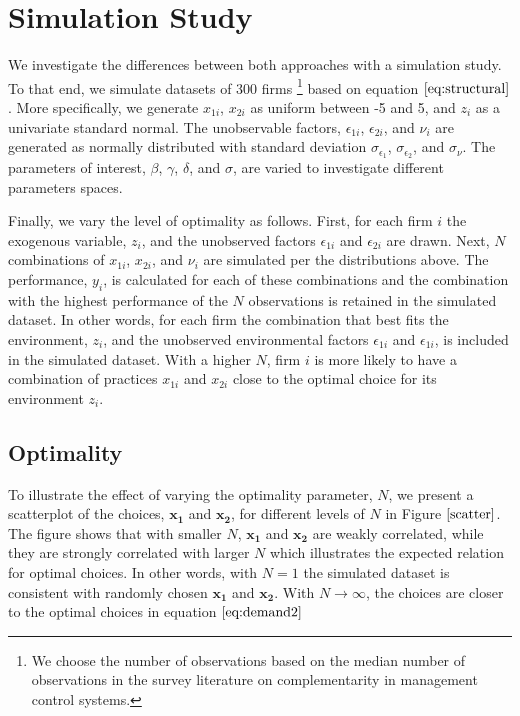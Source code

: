 \documentclass[12pt]{article}
\begin{document}
\section{Simulation Study}\label{simulation-study}

We investigate the differences between both approaches with a simulation
study. To that end, we simulate datasets of 300 firms \footnote{We
  choose the number of observations based on the median number of
  observations in the survey literature on complementarity in management
  control systems.} based on equation \(\eqref{eq:structural}\). More
specifically, we generate \(x_{1i}\), \(x_{2i}\) as uniform between -5
and 5, and \(z_i\) as a univariate standard normal. The unobservable
factors, \(\epsilon_{1i}\), \(\epsilon_{2i}\), and \(\nu_i\) are
generated as normally distributed with standard deviation
\(\sigma_{\epsilon_1}\), \(\sigma_{\epsilon_2}\), and \(\sigma_{\nu}\).
The parameters of interest, \(\beta\), \(\gamma\), \(\delta\), and
\(\sigma\), are varied to investigate different parameters spaces.

Finally, we vary the level of optimality as follows. First, for each
firm \(i\) the exogenous variable, \(z_i\), and the unobserved factors
\(\epsilon_{1i}\) and \(\epsilon_{2i}\) are drawn. Next, \(N\)
combinations of \(x_{1i}\), \(x_{2i}\), and \(\nu_i\) are simulated per
the distributions above. The performance, \(y_i\), is calculated for
each of these combinations and the combination with the highest
performance of the \(N\) observations is retained in the simulated
dataset. In other words, for each firm the combination that best fits
the environment, \(z_i\), and the unobserved environmental factors
\(\epsilon_{1i}\) and \(\epsilon_{1i}\), is included in the simulated
dataset. With a higher \(N\), firm \(i\) is more likely to have a
combination of practices \(x_{1i}\) and \(x_{2i}\) close to the optimal
choice for its environment \(z_i\).

\subsection{Optimality}\label{optimality}

To illustrate the effect of varying the optimality parameter, \(N\), we
present a scatterplot of the choices, \(\mathbf{x_1}\) and
\(\mathbf{x_2}\), for different levels of \(N\) in Figure
\(\ref{scatter}\). The figure shows that with smaller \(N\),
\(\mathbf{x_1}\) and \(\mathbf{x_2}\) are weakly correlated, while they
are strongly correlated with larger \(N\) which illustrates the expected
relation for optimal choices. In other words, with \(N=1\) the simulated
dataset is consistent with randomly chosen \(\mathbf{x_1}\) and
\(\mathbf{x_2}\). With \(N \to \infty\), the choices are closer to the
optimal choices in equation \(\eqref{eq:demand2}\)
\end{document}
